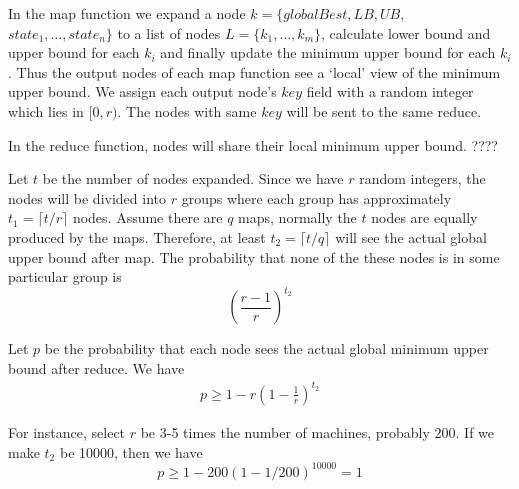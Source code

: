     In the map function we expand a node $k=\{globalBest, LB, UB,$ $state_1, \dots, state_n\}$ to a list of nodes $L=\{k_1, \dots, k_m\}$, calculate lower bound and upper bound for each $k_i$ and finally update the minimum upper bound for each $k_i$. Thus the output nodes of each map function see a `local' view of the minimum upper bound. We assign each output node's $key$ field with a random integer which lies in $[0, r)$. The nodes with same $key$ will be sent to the same reduce.

    In the reduce function, nodes will share their local minimum upper bound. {\color{red}????}

    Let $t$ be the number of nodes expanded. Since we have $r$ random integers, the nodes will be divided into $r$ groups where each group has approximately $t_1=\lceil t/r \rceil$ nodes. Assume there are $q$ maps, normally the $t$ nodes are equally produced by the maps. Therefore, at least $t_2=\lceil t/q \rceil$ will see the actual global upper bound after map. The probability that none of the these nodes is in some particular group is
    \[
        \left(\frac{r-1}{r}\right)^{t_2}
    \]

    Let $p$ be the probability that each node sees the actual global minimum upper bound after reduce. We have
    \begin{align*}
        p \geq 1-r\left(1-\frac{1}{r}\right)^{t_2}
    \end{align*}

    For instance, select $r$ be 3-5 times the number of machines, probably 200. If we make $t_2$ be 10000, then we have
    \[p\geq 1-200(1-1/200)^{10000}=1\]
\newpage 